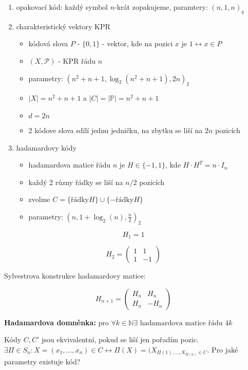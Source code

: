 \begin{prikl}
	\begin{enumerate}
		\item opakovací kód: každý symbol $n$-krát zopakujeme, paramtery: $(n, 1, n)_q$
		\item charakteristický vektory KPR
		\begin{itemize}
			\item kódová slova $P$ - $\{0,1\}$ - vektor, kde na pozici $x$ je $1 \leftrightarrow x \in P$
			\item $(X, \mathcal{P})$ - KPR řádu $n$
			\item parametry: $(n^2 + n + 1, \log_{2} (n^2+n+1), 2n)_{2}$
			\item $|X| = n^2+n+1$ a $|C|=|\mathbb{P}| = n^2+n+1$
			\item $d = 2n$
			\item 2 kódove slova sdílí jednu jedničku, na zbytku se liší na $2n$ pozicích 
		\end{itemize}
		\item hadamardovy kódy
		\begin{itemize}
			\item hadamardova matice řádu $n$ je $H \in \{-1, 1\}$, kde $H \cdot H^T = n \cdot I_n$
			\item každý 2 různy řádky se liší na $n/2$ pozicích
			\item zvolme $C=\{\text{řádky} H\} \cup \{-\text{řádky}H\}$
			\item parametry: $(n, 1+\log_2(n), \frac{n}{2})_2$
		\end{itemize}
	\end{enumerate}
	
	$$
	H_1 = 1
	$$
	
	$$
	H_2 =
	\begin{pmatrix}
		1 & 1 \\
		1 & -1
	\end{pmatrix}
	$$
\end{prikl}

Sylvestrova konstrukce hadamardovy matice:

$$
H_{n+1} = 
\begin{pmatrix}
	H_n & H_n \\
	H_n & - H_n
\end{pmatrix}
$$

\textbf{Hadamardova domněnka:} pro $\forall k \in \mathbb{N} \exists \text{ hadamardova matice řádu } 4k$

Kódy $C, C'$ jsou ekvivalentní, pokud se liší jen pořadím pozic. $\exists \Pi \in S_n: X = (x_1, \dots, x_n) \in C \leftrightarrow \Pi(X) = (X_{\Pi(1), \dots, X_{\Pi(n)} \in C}$. Pro jaké parametry existuje kód?

